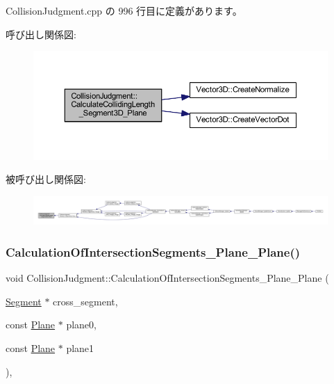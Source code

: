  Collision\+Judgment.\+cpp の 996 行目に定義があります。

呼び出し関係図\+:\nopagebreak
\begin{figure}[H]
\begin{center}
\leavevmode
\includegraphics[width=350pt]{class_collision_judgment_aad2a3d57a7b1c44e894b7a6c1a6ecde0_cgraph}
\end{center}
\end{figure}
被呼び出し関係図\+:
\nopagebreak
\begin{figure}[H]
\begin{center}
\leavevmode
\includegraphics[width=350pt]{class_collision_judgment_aad2a3d57a7b1c44e894b7a6c1a6ecde0_icgraph}
\end{center}
\end{figure}
\mbox{\label{class_collision_judgment_ab454b739b07f965ae4c3c94c53357b45}} 
\subsubsection{\texorpdfstring{Calculation\+Of\+Intersection\+Segments\+\_\+\+Plane\+\_\+\+Plane()}{CalculationOfIntersectionSegments\_Plane\_Plane()}}
{\footnotesize\ttfamily void Collision\+Judgment\+::\+Calculation\+Of\+Intersection\+Segments\+\_\+\+Plane\+\_\+\+Plane (\begin{DoxyParamCaption}\item[{\mbox{\hyperlink{class_segment}{Segment}} $\ast$}]{cross\+\_\+segment,  }\item[{const \mbox{\hyperlink{class_plane}{Plane}} $\ast$}]{plane0,  }\item[{const \mbox{\hyperlink{class_plane}{Plane}} $\ast$}]{plane1 }\end{DoxyParamCaption})\hspace{0.3cm}{\ttfamily [static]}, {\ttfamily [private]}}



